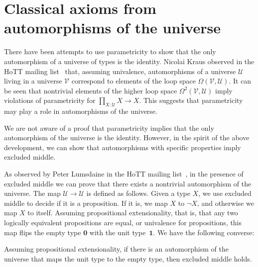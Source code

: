 \documentclass[a4paper,UKenglish]{lipics-v2016}
\newcommand{\UU}{\mathcal{U}}
\newcommand{\Empty}{\mathbf{0}}
\newcommand{\unit}{\mathbf{1}}
\begin{document}
\section{Classical axioms from automorphisms of the universe}

There have been attempts to use parametricity to show that the only
automorphism of a universe of types is the identity.  Nicolai Kraus
observed in the HoTT mailing list~\cite{automorphisms:kraus} that,
assuming univalence, automorphisms of a universe $\UU$ living in a
universe $\mathcal{V}$ correspond to elements of the loop space
$\Omega(\mathcal{V},\UU)$.  It can be seen that nontrivial elements of
the higher loop space $\Omega^2(\mathcal{V},\UU)$ imply violations of
parametricity for $\prod_{X : \UU} X \to X$.  This suggests that
parametricity may play a role in automorphisms of the universe.

We are not aware of a proof that parametricity implies that the only
automorphism of the universe is the identity. However, in the spirit
of the above development, we can show that automorphisms with specific
properties imply excluded middle.

As observed by Peter Lumsdaine in the HoTT mailing
list~\cite{automorphisms:lumsdaine:lem}, in the presence of excluded
middle we can prove that there exists a nontrivial automorphism of the
universe.  The map $\UU\to\UU$ is defined as follows.  Given a type
$X$, we use excluded middle to decide if it is a proposition.  If it
is, we map $X$ to $\neg X$, and otherwise we map $X$ to itself.
Assuming propositional extensionality, that is, that any two logically
equivalent propositions are equal, or univalence for propositions,
this map flips the empty type $\Empty$ with the unit type~$\unit$.
We have the following converse:
\begin{theorem}
\label{thm:automorphism}
Assuming propositional extensionality, if there is an automorphism of the
universe that maps the unit type to the empty type, then excluded middle
holds.
\end{theorem}%
\end{document}
